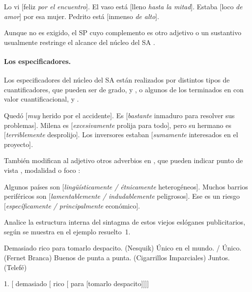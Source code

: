 \begin{exe}
  \ex Lo vi [feliz \textit{por el encuentro}].
  \ex El vaso está [lleno \textit{hasta la mitad}].
  \ex Estaba [loco \textit{de amor}] por esa mujer.
  \ex Pedrito está [inmenso \textit{de alto}].
\end{exe}

Aunque no es exigido, el SP cuyo complemento es otro adjetivo o un sustantivo
usualmente restringe el alcance del núcleo del SA \parencite{ditullio2014}.

\paragraph{Los especificadores.} Los especificadores del núcleo del SA están
realizados por distintos tipos de cuantificadores, que pueden ser de grado,
 y , o algunos de los terminados en
 con valor cuantificacional,  y
.

\begin{exe}
  \ex\label{ex:05-muy} Quedó [\textit{muy} herido por el accidente].
  \ex\label{ex:05-bastante} Es [\textit{bastante} inmaduro para resolver sus
      problemas].
  \ex\label{ex:05-excesivamente} Milena es [\textit{excesivamente} prolija para
      todo], pero su hermano es [\textit{terriblemente} desprolijo].
  \ex\label{ex:05-sumamente} Los inversores estaban [\textit{sumamente}
      interesados en el proyecto].
\end{exe}

También modifican al adjetivo otros adverbios en , que pueden
indicar punto de vista , modalidad  o foco
:

\begin{exe}
  \ex\label{ex:05-pv} Algunos países son [\textit{lingüísticamente /
      étnicamente} heterogéneos].
  \ex\label{ex:05-modalidad} Muchos barrios periféricos son
      [\textit{lamentablemente / indudablemente} peligrosos].
  \ex\label{ex:05-foco} Ese es un riesgo [\textit{específicamente /
      principalmente} económico].
\end{exe}

\begin{ejercicio}\label{ej:05-slogans}
Analice la estructura interna del sintagma de estos viejos eslóganes
publicitarios, según se muestra en el ejemplo resuelto~1.

\begin{exe}
  \ex Demasiado rico para tomarlo despacito. (Nesquik)
  \ex Único en el mundo. / Único. (Fernet Branca)
  \ex Buenos de punta a punta. (Cigarrillos Imparciales)
  \ex Juntos. (Telefé)
\end{exe}

\begin{resuelto}
1. [ demasiado [ rico [
para [tomarlo despacito]]]]
\end{resuelto}
\end{ejercicio}

